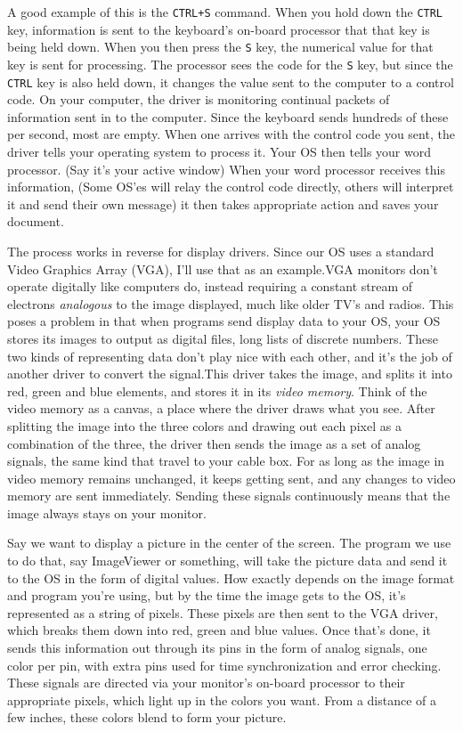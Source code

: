 \documentclass[english]{paper}
\begin{document}
A good example of this is the \texttt{CTRL+S} command. When you hold down the \texttt{CTRL} key, information is sent to the keyboard's on-board processor that that key is being held down. When you then press the \texttt{S} key, the numerical value for that key is sent for processing. The processor sees the code for the \texttt{S} key, but since the \texttt{CTRL} key is also held down, it changes the value sent to the computer to a control code. On your computer, the driver is monitoring continual packets of information sent in to the computer. Since the keyboard sends hundreds of these per second, most are empty. When one arrives with the control code you sent, the driver tells your operating system to process it. Your OS then tells your word processor. (Say it's your active window) When your word processor receives this information, (Some OS'es will relay the control code directly, others will interpret it and send their own message) it then takes appropriate action and saves your document.

The process works in reverse for display drivers. Since our OS uses a standard Video Graphics Array (VGA), I'll use that as an example.VGA monitors don't operate digitally like computers do, instead requiring a constant stream of electrons {\it analogous} to the image displayed, much like older TV's and radios. This poses a problem in that when programs send display data to your OS, your OS stores its images to output as digital files, long lists of discrete numbers. These two kinds of representing data don't play nice with each other, and it's the job of another driver to convert the signal.This driver takes the image, and splits it into red, green and blue elements, and stores it in its {\it video memory}. Think of the video memory as a canvas, a place where the driver draws what you see. After splitting the image into the three colors and drawing out each pixel as a combination of the three, the driver then sends the image as a set of analog signals, the same kind that travel to your cable box. For as long as the image in video memory remains unchanged, it keeps getting sent, and any changes to video memory are sent immediately. Sending these signals continuously means that the image always stays on your monitor.

Say we want to display a picture in the center of the screen. The program we use to do that, say ImageViewer or something, will take the picture data and send it to the OS in the form of digital values. How exactly depends on the image format and program you're using, but by the time the image gets to the OS, it's represented as a string of pixels. These pixels are then sent to the VGA driver, which breaks them down into red, green and blue values. Once that's done, it sends this information out through its pins in the form of analog signals, one color per pin, with extra pins used for time synchronization and error checking. These signals are directed via your monitor's on-board processor to their appropriate pixels, which light up in the colors you want. From a distance of a few inches, these colors blend to form your picture.
\end{document}
